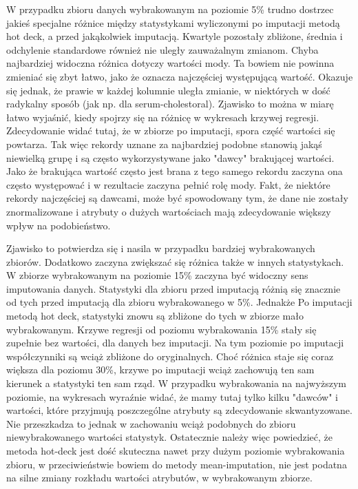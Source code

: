 \documentclass{classrep}
\begin{document}
{{            W przypadku zbioru danych wybrakowanym na poziomie 5\% trudno dostrzec jakieś specjalne różnice między statystykami wyliczonymi po imputacji metodą hot deck, a przed jakąkolwiek imputacją. Kwartyle pozostały zbliżone, średnia i odchylenie standardowe również nie uległy zauważalnym zmianom. Chyba najbardziej widoczna różnica dotyczy wartości mody. Ta bowiem nie powinna zmieniać się zbyt łatwo, jako że oznacza najczęściej występującą wartość. Okazuje się jednak, że prawie w każdej kolumnie uległa zmianie, w niektórych w dość radykalny sposób (jak np. dla serum-cholestoral). Zjawisko to można w miarę łatwo wyjaśnić, kiedy spojrzy się na różnicę w wykresach krzywej regresji. Zdecydowanie widać tutaj, że w zbiorze po imputacji, spora część wartości się powtarza. Tak więc rekordy uznane za najbardziej podobne stanowią jakąś niewielką grupę i są często wykorzystywane jako "dawcy" brakującej wartości. Jako że brakująca wartość często jest brana z tego samego rekordu zaczyna ona często występować i w rezultacie zaczyna pełnić rolę mody. Fakt, że niektóre rekordy najczęściej są dawcami, może być spowodowany tym, że dane nie zostały znormalizowane i atrybuty o dużych wartościach mają zdecydowanie większy wpływ na podobieństwo.
            
            Zjawisko to potwierdza się i nasila w przypadku bardziej wybrakowanych zbiorów. Dodatkowo zaczyna zwiększać się różnica także w innych statystykach. W zbiorze wybrakowanym na poziomie 15\% zaczyna być widoczny sens imputowania danych. Statystyki dla zbioru przed imputacją różnią się znacznie od tych przed imputacją dla zbioru wybrakowanego w 5\%. Jednakże Po imputacji metodą hot deck, statystyki znowu są zbliżone do tych w zbiorze mało wybrakowanym. Krzywe regresji od poziomu wybrakowania 15\% stały się zupełnie bez wartości, dla danych bez imputacji. Na tym poziomie po imputacji współczynniki są wciąż zbliżone do oryginalnych. Choć różnica staje się coraz większa dla poziomu 30\%, krzywe po imputacji wciąż zachowują ten sam kierunek a statystyki ten sam rząd. W przypadku wybrakowania na najwyższym poziomie, na wykresach wyraźnie widać, że mamy tutaj tylko kilku "dawców" i wartości, które przyjmują poszczególne atrybuty są zdecydowanie skwantyzowane. Nie przeszkadza to jednak w zachowaniu wciąż podobnych do zbioru niewybrakowanego wartości statystyk. Ostatecznie należy więc powiedzieć, że metoda hot-deck jest dość skuteczna nawet przy dużym poziomie wybrakowania zbioru, w przeciwieństwie bowiem do metody mean-imputation, nie jest podatna na silne zmiany rozkładu wartości atrybutów, w wybrakowanym zbiorze.

}}
\end{document}
